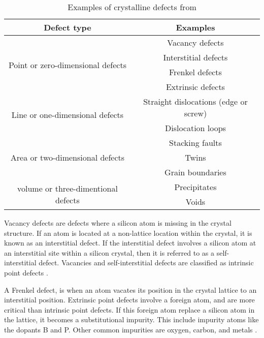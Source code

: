 \begin{table}[H]
\begin{tabular}{|c|c|}

\hline
\textbf{Defect type} & \textbf{Examples} \\ \hline

\multirow{4}{*}{Point or zero-dimensional defects} & Vacancy defects \\
 & Interstitial defects \\
 & Frenkel defects \\
 & Extrinsic defects \\ \hline
 
\multirow{2}{*}{Line or one-dimensional defects} & Straight dislocations (edge or screw) \\
 & Dislocation loops \\ \hline
 
\multirow{3}{*}{Area or two-dimensional defects} & Stacking faults \\
 & Twins \\
 & Grain boundaries \\ \hline

\multirow{2}{*}{volume or three-dimentional defects} & Precipitates \\
 & Voids \\ \hline

\end{tabular}
\caption{Examples of crystalline defects from \cite{siliconfareast}}
\label{tab:crystalline_defects}
\end{table}

Vacancy defects are defects where a silicon atom is missing in the crystal structure. If an atom is located at a non-lattice location within the crystal, it is known as an interstitial defect. If the interstitial defect involves a silicon atom at an interstitial site within a silicon crystal, then it is referred to as a self-interstitial defect. Vacancies and self-interstitial defects are classified as intrinsic point defects \cite{siliconfareast}.
            
A Frenkel defect, is when an atom vacates its position in the crystal lattice to an interstitial position. Extrinsic point defects involve a foreign atom, and are more critical than intrinsic point defects. If this foreign atom replace a silicon atom in the lattice, it becomes a substitutional impurity. This include impurity atoms like the dopants B and P. Other common impurities are oxygen, carbon, and metals \cite{davies88}.


